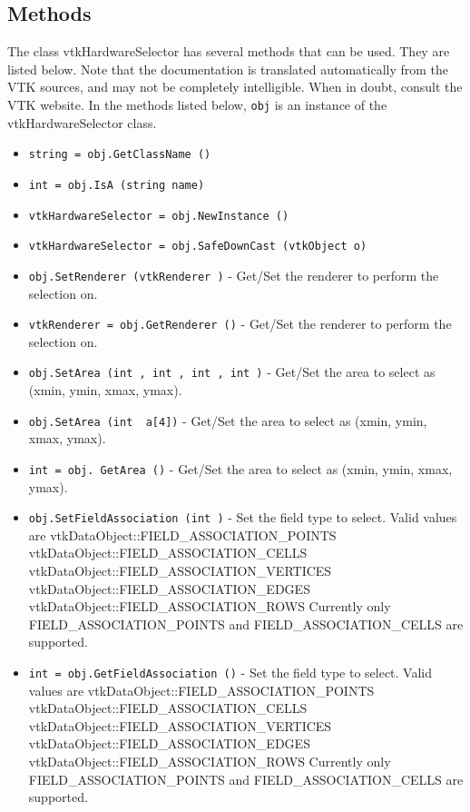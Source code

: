 \subsection{Methods}

The class vtkHardwareSelector has several methods that can be used.
  They are listed below.
Note that the documentation is translated automatically from the VTK sources,
and may not be completely intelligible.  When in doubt, consult the VTK website.
In the methods listed below, \verb|obj| is an instance of the vtkHardwareSelector class.
\begin{itemize}
\item  \verb|string = obj.GetClassName ()|

\item  \verb|int = obj.IsA (string name)|

\item  \verb|vtkHardwareSelector = obj.NewInstance ()|

\item  \verb|vtkHardwareSelector = obj.SafeDownCast (vtkObject o)|

\item  \verb|obj.SetRenderer (vtkRenderer )| -  Get/Set the renderer to perform the selection on.

\item  \verb|vtkRenderer = obj.GetRenderer ()| -  Get/Set the renderer to perform the selection on.

\item  \verb|obj.SetArea (int , int , int , int )| -  Get/Set the area to select as (xmin, ymin, xmax, ymax).

\item  \verb|obj.SetArea (int  a[4])| -  Get/Set the area to select as (xmin, ymin, xmax, ymax).

\item  \verb|int = obj. GetArea ()| -  Get/Set the area to select as (xmin, ymin, xmax, ymax).

\item  \verb|obj.SetFieldAssociation (int )| -  Set the field type to select. Valid values are 
  vtkDataObject::FIELD\_ASSOCIATION\_POINTS
  vtkDataObject::FIELD\_ASSOCIATION\_CELLS
  vtkDataObject::FIELD\_ASSOCIATION\_VERTICES
  vtkDataObject::FIELD\_ASSOCIATION\_EDGES
  vtkDataObject::FIELD\_ASSOCIATION\_ROWS
 Currently only FIELD\_ASSOCIATION\_POINTS and FIELD\_ASSOCIATION\_CELLS are
 supported.

\item  \verb|int = obj.GetFieldAssociation ()| -  Set the field type to select. Valid values are 
  vtkDataObject::FIELD\_ASSOCIATION\_POINTS
  vtkDataObject::FIELD\_ASSOCIATION\_CELLS
  vtkDataObject::FIELD\_ASSOCIATION\_VERTICES
  vtkDataObject::FIELD\_ASSOCIATION\_EDGES
  vtkDataObject::FIELD\_ASSOCIATION\_ROWS
 Currently only FIELD\_ASSOCIATION\_POINTS and FIELD\_ASSOCIATION\_CELLS are
 supported.


\end{itemize}
